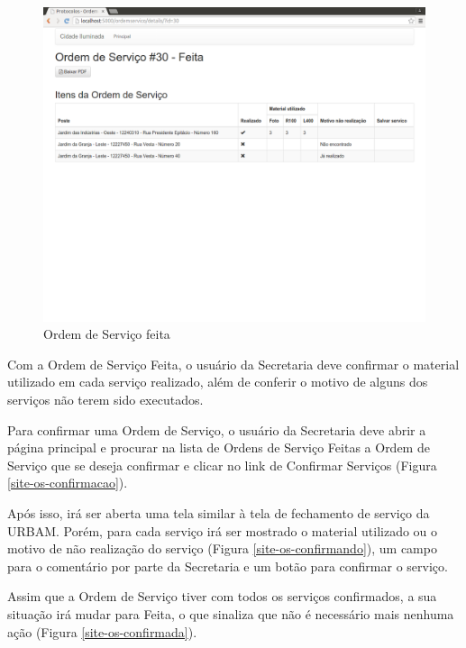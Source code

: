 \documentclass[
	article,			%
	11pt,				%
	oneside,			%
	a4paper,			%
	english,			%
	brazil,				%
	sumario=tradicional
	]{abntex2}
\begin{document}
\begin{figure}[!htbp]
 \centering
 \caption{\label{site-os-feita}Ordem de Serviço feita}
 \includegraphics[scale=0.25]{site/17-os_feita.png}
\end{figure}

\clearpage

Com a Ordem de Serviço Feita, o usuário da Secretaria deve confirmar o material utilizado em cada
serviço realizado, além de conferir o motivo de alguns dos serviços não terem sido executados.

Para confirmar uma Ordem de Serviço, o usuário da Secretaria deve abrir a página principal e procurar
na lista de Ordens de Serviço Feitas a Ordem de Serviço que se deseja confirmar e clicar no link de
Confirmar Serviços (Figura \ref{site-os-confirmacao}).

Após isso, irá ser aberta uma tela similar à tela de fechamento de serviço da URBAM. Porém, para
cada serviço irá ser mostrado o material utilizado ou o motivo de não realização do serviço
(Figura \ref{site-os-confirmando}), um campo para o comentário por parte da Secretaria e um botão
para confirmar o serviço.

Assim que a Ordem de Serviço tiver com todos os serviços confirmados, a sua situação irá mudar para
Feita, o que sinaliza que não é necessário mais nenhuma ação (Figura \ref{site-os-confirmada}).
\end{document}
